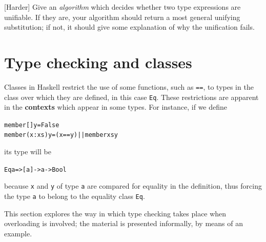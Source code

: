 \begin{exercises}
\item
{[Harder]} Give an {\em algorithm\/} which decides whether two
type expressions are unifiable. If they are, your algorithm
should return a most general unifying substitution; if not, it
should give some explanation of why the unification fails.
\end{exercises}

\section{Type checking and classes}
\label{typeCheckClasses}

Classes in Haskell restrict the use of some functions, such as \texttt{==}, to
types in the class over which they are defined, in this case \texttt{Eq}. These
restrictions are apparent in the \textbf{contexts} which appear in some types.
For instance, if we define
\begin{alltt}
member []     y = False
member (x:xs) y = (x==y) || member xs y
\end{alltt}
its type will be
\begin{alltt}
Eq a => [a] -> a -> Bool
\end{alltt} 
because \texttt{x} and \texttt{y} of type \texttt{a} are compared for
equality in the definition, thus forcing the type 
\texttt{a} to belong to
the equality class \texttt{Eq}.

This section explores the way in which type checking takes place when overloading
is involved; the material is presented informally, by means of an
example. 


